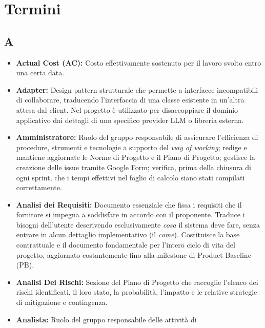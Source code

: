 \section{Termini}
 
{}
\subsection*{A}
\begin{itemize}[leftmargin=*]
      \item \textbf{Actual Cost (AC):} Costo effettivamente sostenuto per il lavoro 
      svolto entro una certa data.
      \item \textbf{Adapter:} Design pattern strutturale che permette a interfacce incompatibili di collaborare, traducendo l'interfaccia di una classe esistente in un'altra attesa dal client. Nel progetto è utilizzato per disaccoppiare il dominio applicativo dai dettagli di uno specifico provider LLM o libreria esterna.
      \item \textbf{Amministratore:} Ruolo del gruppo responsabile di assicurare
      l'efficienza di procedure, strumenti e tecnologie a supporto del
      \textit{way of working}; redige e mantiene aggiornate le Norme di
      Progetto e il Piano di Progetto; gestisce la creazione delle issue tramite Google Form; verifica,
      prima della chiusura di ogni sprint, che i tempi effettivi nel foglio di
      calcolo siano stati compilati correttamente.
      \item \textbf{Analisi dei Requisiti:} Documento essenziale che fissa i requisiti che il fornitore si impegna a soddisfare in accordo con il proponente. Traduce i bisogni dell'utente descrivendo esclusivamente \textit{cosa} il sistema deve fare, senza entrare in alcun dettaglio implementativo (il \textit{come}). Costituisce la base contrattuale e il documento fondamentale per l'intero ciclo di vita del progetto, aggiornato costantemente fino alla milestone di Product Baseline (PB).
      \item \textbf{Analisi Dei Rischi:} Sezione del Piano di Progetto che raccoglie l'elenco dei rischi identificati, il loro stato, la probabilità, l'impatto e le relative strategie di mitigazione e contingenza.
      \item \textbf{Analista:} Ruolo del gruppo responsabile delle attività di

\end{itemize}
